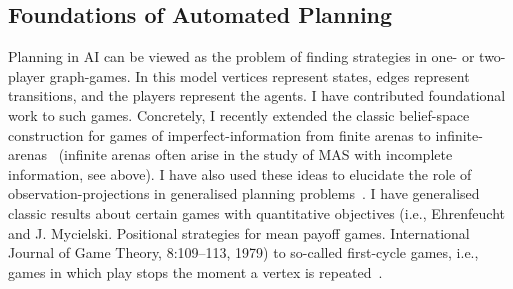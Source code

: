 \documentclass[10pt,a4paper,sans]{moderncv}
\begin{document}


 
\subsection{Foundations of Automated Planning}
Planning in AI can be viewed as the problem of finding strategies in one- or two-player graph-games. In this model vertices represent states, edges represent transitions, and the players represent the agents. I have contributed foundational work to such games. Concretely, I recently extended the classic belief-space construction for games of imperfect-information from finite arenas to infinite-arenas~\cite{GMRS16IJCAI} (infinite arenas often arise in the study of MAS with incomplete information, see above). I have also used these ideas to elucidate the role of observation-projections in generalised planning problems~\cite{BDGR17ICAPS,BDGR17}.
I have generalised classic results about certain games with quantitative objectives (i.e., Ehrenfeucht and J. Mycielski. Positional strategies for mean payoff games. International Journal of Game Theory, 8:109--113, 1979) to so-called first-cycle games, i.e., games in which play stops the moment a vertex is repeated~\cite{AR16}. 
\newline
\end{document}
